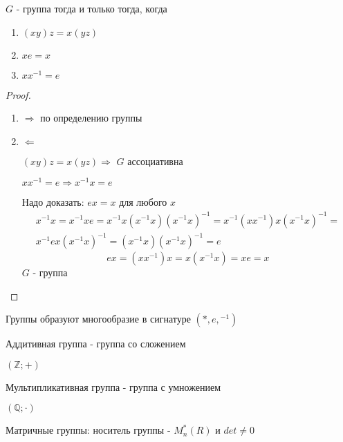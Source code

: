 \documentclass[../main/document.tex]{subfiles}
\begin{document}
\begin{exm}
\end{exm}
\begin{thm}\label{group-qualities}
$G$ - группа тогда и только тогда, когда
\begin{enumerate}
\item $(xy)z=x(yz)$
\item $xe=x$
\item $xx^{-1}=e$
\end{enumerate}
\begin{proof}
\begin{enumerate}
\item $\Rightarrow$ по определению группы
\item $\Leftarrow$

$(xy)z=x(yz)\Rightarrow$ $G$ ассоциативна

$xx^{-1}=e\Rightarrow x^{-1}x=e$

Надо доказать: $ex=x$ для любого $x$
\begin{multline}
x^{-1}x=x^{-1}xe=x^{-1}x(x^{-1}x)(x^{-1}x)^{-1}=x^{-1}(xx^{-1})x(x^{-1}x)^{-1}=\\
x^{-1}ex(x^{-1}x)^{-1}=(x^{-1}x)(x^{-1}x)^{-1}=e
\end{multline}
$$ex=(xx^{-1})x=x(x^{-1}x)=xe=x$$
$G$ - группа
\end{enumerate}
\end{proof}
\end{thm}
\begin{cnsq}
Группы образуют многообразие в сигнатуре $(*,e,{ }^{-1})$
\end{cnsq}
\begin{dfn}
Аддитивная группа - группа со сложением
\end{dfn}
\begin{exm}
$(\mathbb{Z};+)$
\end{exm}
\begin{dfn}
Мультипликативная группа - группа с умножением
\end{dfn}
\begin{exm}
$(\mathbb{Q};\cdot)$
\end{exm}
\begin{dfn}
\end{dfn}
\begin{exm}
\end{exm}
\begin{dfn}
Матричные группы: носитель группы - $M^*_n(R)$ и $det\neq 0$
\end{dfn}
\end{document}
